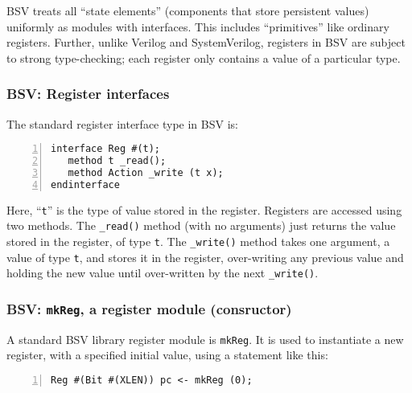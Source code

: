 
BSV treats all ``state elements'' (components that store persistent
values) uniformly as modules with interfaces.  This includes
``primitives'' like ordinary registers.  Further, unlike Verilog and
SystemVerilog, registers in BSV are subject to strong type-checking;
each register only contains a value of a particular type.


\subsubsection{BSV: Register interfaces}


The standard register interface type in BSV is:

\begin{Verbatim}[frame=single, numbers=left]
interface Reg #(t);
   method t _read();
   method Action _write (t x);
endinterface
\end{Verbatim}

Here, ``\verb|t|'' is the type of value stored in the register.
Registers are accessed using two methods.  The \verb|_read()| method
(with no arguments) just returns the value stored in the register, of
type \verb|t|.  The \verb|_write()| method takes one argument, a value
of type \verb|t|, and stores it in the register, over-writing any
previous value and holding the new value until over-written by the
next \verb|_write()|.


\subsubsection{BSV: {\tt mkReg}, a register module (consructor)}


A standard BSV library register module is \verb|mkReg|.  It is used to
instantiate a new register, with a specified initial value, using a
statement like this:

\begin{Verbatim}[frame=single, numbers=left]
    Reg #(Bit #(XLEN)) pc <- mkReg (0);
\end{Verbatim}

